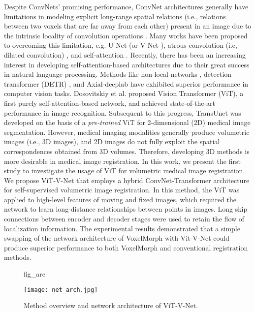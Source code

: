 \documentclass{midl}
\begin{document}
Despite ConvNets' promising performance, ConvNet architectures generally have limitations in modeling explicit long-range spatial relations (i.e., relations between two voxels that are far away from each other) present in an image due to the intrinsic locality of convolution operations \cite{chen2021transunet}. Many works have been proposed to overcoming this limitation, e.g. U-Net \cite{ronneberger2015u} (or V-Net \cite{milletari2016v}), atrous convolution (i.e, dilated convolution) \cite{yu2015multi}, and self-attention \cite{vaswani2017attention}. Recently, there has been an increasing interest in developing self-attention-based architectures due to their great success in natural language processing. Methods like non-local networks \cite{wang2018non}, detection transformer (DETR) \cite{carion2020end}, and Axial-deeplab \cite{wang2020axial} have exhibited superior performance in computer vision tasks. Dosovitskiy et al. \cite{dosovitskiy2020image} proposed Vision Transformer (ViT), a first purely self-attention-based network, and achieved state-of-the-art performance in image recognition. Subsequent to this progress, TransUnet \cite{chen2021transunet} was developed on the basis of a \textit{pre-trained} ViT for 2-dimensional (2D) medical image segmentation. However, medical imaging modalities generally produce volumetric images (i.e., 3D images), and 2D images do not fully exploit the spatial correspondences obtained from 3D volumes. Therefore, developing 3D methods is more desirable in medical image registration. In this work, we present the first study to investigate the usage of ViT for volumetric medical image registration. We propose ViT-V-Net that employs a hybrid ConvNet-Transformer architecture for self-supervised volumetric image registration. In this method, the ViT was applied to high-level features of moving and fixed images, which required the network to learn long-distance relationships between points in images. Long skip connections between encoder and decoder stages were used to retain the flow of localization information. The experimental results demonstrated that a simple swapping of the network architecture of VoxelMorph with Vit-V-Net could produce superior performance to both VoxelMorph and conventional registration methods.

\begin{figure}[t]
\floatconts
{fig_arc}
  {\caption{Method overview and network architecture of ViT-V-Net.}}
  {\texttt{[image: net\_arch.jpg]}\vspace{-4mm}}
  \vspace{-4.5mm}
\end{figure}
\end{document}
